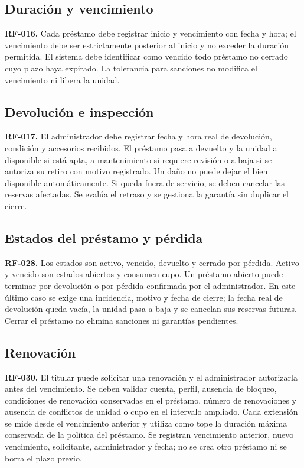 \subsection{Duraci\'on y vencimiento}
\textbf{RF-016.} Cada pr\'estamo debe registrar inicio y vencimiento con fecha y hora; el vencimiento debe ser estrictamente posterior al inicio y no exceder la duraci\'on permitida. El sistema debe identificar como vencido todo pr\'estamo no cerrado cuyo plazo haya expirado. La tolerancia para sanciones no modifica el vencimiento ni libera la unidad.

\subsection{Devoluci\'on e inspecci\'on}
\textbf{RF-017.} El administrador debe registrar fecha y hora real de devoluci\'on, condici\'on y accesorios recibidos. El pr\'estamo pasa a devuelto y la unidad a disponible si est\'a apta, a mantenimiento si requiere revisi\'on o a baja si se autoriza su retiro con motivo registrado. Un da\~no no puede dejar el bien disponible autom\'aticamente. Si queda fuera de servicio, se deben cancelar las reservas afectadas. Se eval\'ua el retraso y se gestiona la garant\'ia sin duplicar el cierre.

\subsection{Estados del pr\'estamo y p\'erdida}
\textbf{RF-028.} Los estados son activo, vencido, devuelto y cerrado por p\'erdida. Activo y vencido son estados abiertos y consumen cupo. Un pr\'estamo abierto puede terminar por devoluci\'on o por p\'erdida confirmada por el administrador. En este \'ultimo caso se exige una incidencia, motivo y fecha de cierre; la fecha real de devoluci\'on queda vac\'ia, la unidad pasa a baja y se cancelan sus reservas futuras. Cerrar el pr\'estamo no elimina sanciones ni garant\'ias pendientes.

\subsection{Renovaci\'on}
\textbf{RF-030.} El titular puede solicitar una renovaci\'on y el administrador autorizarla antes del vencimiento. Se deben validar cuenta, perfil, ausencia de bloqueo, condiciones de renovaci\'on conservadas en el pr\'estamo, n\'umero de renovaciones y ausencia de conflictos de unidad o cupo en el intervalo ampliado. Cada extensi\'on se mide desde el vencimiento anterior y utiliza como tope la duraci\'on m\'axima conservada de la pol\'itica del pr\'estamo. Se registran vencimiento anterior, nuevo vencimiento, solicitante, administrador y fecha; no se crea otro pr\'estamo ni se borra el plazo previo.

